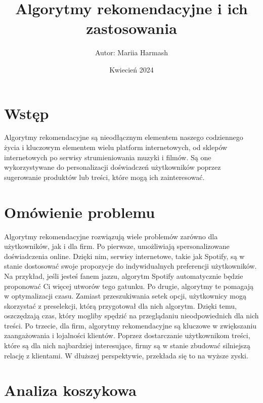 \documentclass{article}
\title{Algorytmy rekomendacyjne i ich zastosowania}
\author{Autor: Mariia Harmash}
\date{Kwiecień 2024}
\begin{document}
\maketitle
\newpage

\section{Wstęp}

Algorytmy rekomendacyjne są nieodłącznym elementem naszego codziennego życia i kluczowym elementem wielu platform internetowych,
od sklepów internetowych po serwisy strumieniowania muzyki i filmów. Są one wykorzystywane do personalizacji doświadczeń użytkowników
poprzez sugerowanie produktów lub treści, które mogą ich zainteresować.

\section{Omówienie problemu}

Algorytmy rekomendacyjne rozwiązują wiele problemów zarówno dla użytkowników, jak i dla firm. \newline
Po pierwsze, umożliwiają spersonalizowane doświadczenia online. Dzięki nim, serwisy internetowe, takie jak Spotify, są w stanie dostosować swoje propozycje 
do indywidualnych preferencji użytkowników. Na przykład, jeśli jesteś fanem jazzu, algorytm Spotify automatycznie będzie proponować Ci więcej utworów tego gatunku.\newline
Po drugie, algorytmy te pomagają w optymalizacji czasu. Zamiast przeszukiwania setek opcji, użytkownicy mogą skorzystać z preselekcji, którą przygotował dla nich algorytm. 
Dzięki temu, oszczędzają czas, który mogliby spędzić na przeglądaniu nieodpowiednich dla nich treści.\newline
Po trzecie, dla firm, algorytmy rekomendacyjne są kluczowe w zwiększaniu zaangażowania i lojalności klientów. Poprzez dostarczanie użytkownikom treści, 
które są dla nich najbardziej interesujące, firmy są w stanie zbudować silniejszą relację z klientami. W dłuższej perspektywie, przekłada się to na wyższe zyski.

\section{Analiza koszykowa}
\end{document}
